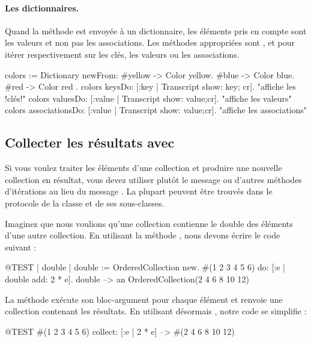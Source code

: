 \documentclass[a4paper,10pt,twoside]{book}
\begin{document}
\paragraph{Les dictionnaires.}
Quand la méthode  est envoyée à un dictionnaire,
les éléments pris en compte sont les valeurs et non pas les associations.
Les méthodes appropriées sont ,  et  pour itérer respectivement sur les clés, les valeurs ou les associations.

\begin{code}{}
colors := Dictionary newFrom: { #yellow -> Color yellow. #blue -> Color blue. #red -> Color red }.
colors keysDo: [:key | Transcript show: key; cr].                    "affiche les !clés!"
colors valuesDo: [:value | Transcript show: value;cr].            "affiche les valeurs"
colors associationsDo: [:value | Transcript show: value;cr].  "affiche les associations"
\end{code}

\subsection{Collecter les résultats avec }
Si vous voulez traiter les éléments d'une collection et produire
une nouvelle collection en résultat, vous devez utiliser plutôt le
message  ou d'autres méthodes d'itérations au lieu
du message .
La plupart peuvent être trouvés dans le protocole  
de la classe  et de ses sous-classes.

Imaginez que nous voulions qu'une collection contienne le double des éléments d'une autre collection. 
En utilisant la méthode , nous devons écrire le code suivant :

\begin{code}{@TEST | double |}
double := OrderedCollection new.
#(1 2 3 4 5 6) do: [:e | double add: 2 * e].
double --> an OrderedCollection(2 4 6 8 10 12)
\end{code}

\noindent
La méthode  exécute son bloc-argument
pour chaque élément et renvoie une collection contenant les résultats.
En utilisant désormais , notre code se simplifie :
\begin{code}{@TEST}
#(1 2 3 4 5 6) collect: [:e | 2 * e] --> #(2 4 6 8 10 12)
\end{code}
\end{document}
